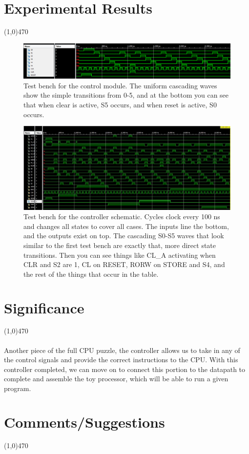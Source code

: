 \documentclass[12pt]{article}
\begin{document}
			
\section{Experimental Results}\vspace{-.7cm} \line(1,0){470}

\begin{figure}[h]
    \centering
	\includegraphics[scale=.48]{control_tb.png}
	\caption{Test bench for the control module. The uniform cascading waves show the simple transitions from 0-5, and at the bottom you can see that when clear is active, S5 occurs, and when reset is active, S0 occurs.}
\end{figure}

\begin{figure}[h]
    \centering
	\includegraphics[scale=.33]{controller_tb.png}
	\caption{Test bench for the controller schematic. Cycles clock every 100 ns and changes all states to cover all cases. The inputs line the bottom, and the outputs exist on top. The cascading S0-S5 waves  that look similar to the first test bench are exactly that, more direct state transitions. Then you can see things like CL\_A activating when CLR and S2 are 1, CL on RESET, RORW on STORE and S4, and the rest of the things that occur in the table.}
\end{figure}


	\newpage
\section{Significance} \vspace{-.7cm} \line(1,0){470}
	\paragraph{} Another piece of the full CPU puzzle, the controller allows us to take in any of the control signals and provide the correct instructions to the CPU. With this controller completed, we can move on to connect this portion to the datapath to complete and assemble the toy processor, which will be able to run a given program.


 \section{Comments/Suggestions}\vspace{-.7cm} \line(1,0){470}
 	\paragraph{} 
		
\end{document}
